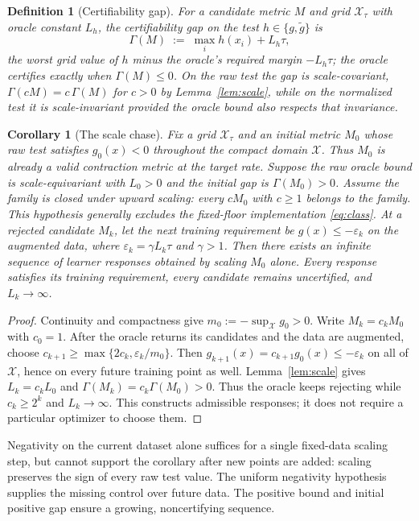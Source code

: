 \documentclass[12pt,onecolumn,journal]{IEEEtran}
\newtheorem{corollary}{Corollary}
\newtheorem{definition}{Definition}
\newcommand{\X}{\mathcal{X}}
\begin{document}
\begin{definition}[Certifiability gap]
\label{def:gap}
For a candidate metric $M$ and grid $\X_\tau$ with oracle constant $L_h$, the certifiability gap on the test $h \in \{g, \tilde g\}$ is
\[
\Gamma(M) \;:=\; \max_i h(x_i) + L_h\tau,
\]
the worst grid value of $h$ minus the oracle's required margin $-L_h\tau$; the oracle certifies exactly when $\Gamma(M) \le 0$. On the raw test the gap is scale-covariant, $\Gamma(cM) = c\,\Gamma(M)$ for $c > 0$ by Lemma~\ref{lem:scale}, while on the normalized test it is scale-invariant provided the oracle bound also respects that invariance.
\end{definition}

\begin{corollary}[The scale chase]
\label{cor:chase}
Fix a grid $\X_\tau$ and an initial metric $M_0$ whose raw test satisfies $g_0(x)<0$ throughout the compact domain $\X$. Thus $M_0$ is already a valid contraction metric at the target rate. Suppose the raw oracle bound is scale-equivariant with $L_0>0$ and the initial gap is $\Gamma(M_0)>0$. Assume the family is closed under upward scaling: every $cM_0$ with $c\ge1$ belongs to the family. This hypothesis generally excludes the fixed-floor implementation \eqref{eq:class}. At a rejected candidate $M_k$, let the next training requirement be $g(x)\le-\varepsilon_k$ on the augmented data, where $\varepsilon_k=\gamma L_k\tau$ and $\gamma>1$. Then there exists an infinite sequence of learner responses obtained by scaling $M_0$ alone. Every response satisfies its training requirement, every candidate remains uncertified, and $L_k\to\infty$.
\end{corollary}

\begin{proof}
Continuity and compactness give $m_0:=-\sup_\X g_0>0$. Write $M_k=c_kM_0$ with $c_0=1$. After the oracle returns its candidates and the data are augmented, choose $c_{k+1}\ge\max\{2c_k,\varepsilon_k/m_0\}$. Then $g_{k+1}(x)=c_{k+1}g_0(x)\le-\varepsilon_k$ on all of $\X$, hence on every future training point as well. Lemma~\ref{lem:scale} gives $L_k=c_kL_0$ and $\Gamma(M_k)=c_k\Gamma(M_0)>0$. Thus the oracle keeps rejecting while $c_k\ge2^k$ and $L_k\to\infty$. This constructs admissible responses; it does not require a particular optimizer to choose them.
\end{proof}

Negativity on the current dataset alone suffices for a single fixed-data scaling step, but cannot support the corollary after new points are added: scaling preserves the sign of every raw test value. The uniform negativity hypothesis supplies the missing control over future data. The positive bound and initial positive gap ensure a growing, noncertifying sequence.
\end{document}
